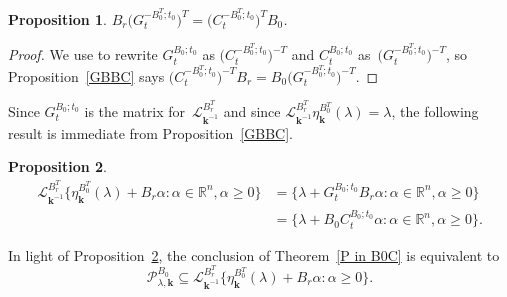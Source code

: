\documentclass[10pt]{article}
\newtheorem{proposition}{Proposition}[section]
\theoremstyle{definition}
\theoremstyle{remark}
\numberwithin{equation}{section}
\newcommand{\reals}{\mathbb R}
\newcommand{\sett}[1]{{\bigl\lbrace #1 \bigr\rbrace}}
\newcommand{\0}{{\mathbf{0}}}
\newcommand{\kk}{{\boldsymbol{k}}}
\renewcommand{\L}{\mathcal{L}}
\renewcommand{\P}{\mathcal{P}}
\begin{document}
\begin{proposition}\label{BGCB}
$B_r\bigl(G_t^{-B_0^T;t_0}\bigr)^T=\bigl(C_t^{-B_0^T;t_0}\bigr)^TB_0$.
\end{proposition}
\begin{proof}
We use \cite[Theorem~1.2]{NZ} to rewrite $G_t^{B_0;t_0}$ as $\bigl(C_t^{-B_0^T;t_0}\bigr)^{-T}$ and $C_t^{B_0;t_0}$ as~$\bigl(G_t^{-B_0^T;t_0}\bigr)^{-T}$, so Proposition~\ref{GBBC} says $\bigl(C_t^{-B_0^T;t_0}\bigr)^{-T}B_r=B_0\bigl(G_t^{-B_0^T;t_0}\bigr)^{-T}$.
\end{proof}

Since $G_t^{B_0;t_0}$ is the matrix for~$\L_{\kk^{-1}}^{B_r^T}$ and since $\L_{\kk^{-1}}^{B_r^T}\eta_\kk^{B_0^T}(\lambda)=\lambda$, the following result is immediate from Proposition~\ref{GBBC}.

\begin{proposition}\label{B0C}
\begin{align*}
\L_{\kk^{-1}}^{B_r^T}\sett{\eta_\kk^{B_0^T}(\lambda)+B_r\alpha:\alpha\in\reals^n,\alpha\ge0}
&=\sett{\lambda+G_t^{B_0;t_0}B_r\alpha:\alpha\in\reals^n,\alpha\ge0}\\
&=\sett{\lambda+B_0C_t^{B_0;t_0}\alpha:\alpha\in\reals^n,\alpha\ge0}.
\end{align*}
\end{proposition}

In light of Proposition~\ref{B0C}, the conclusion of Theorem~\ref{P in B0C} is equivalent to
\[\P^{B_0}_{\lambda,\kk}\subseteq\L_{\kk^{-1}}^{B_r^T}\sett{\eta_\kk^{B_0^T}(\lambda)+B_r\alpha:\alpha\ge0}.\]
\end{document}
